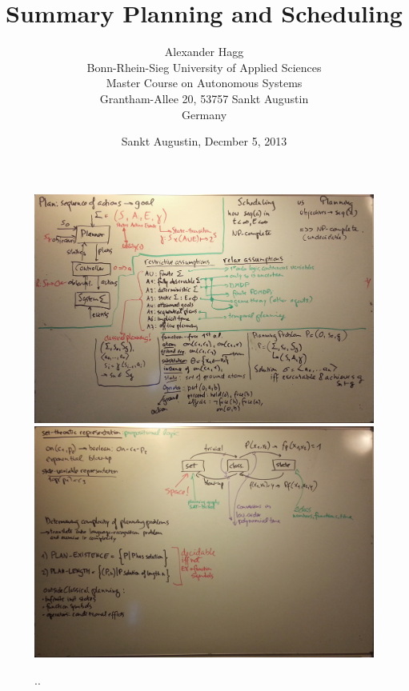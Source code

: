 \documentclass[a4paper,11pt,notitlepage]{article}
\title{\Huge\bf Summary Planning and Scheduling}
\author{\large Alexander Hagg\\
	Bonn-Rhein-Sieg University of Applied Sciences \\
	Master Course on Autonomous Systems \\
	Grantham-Allee 20, 53757 Sankt Augustin \\ Germany }
\date{Sankt Augustin, Decmber 5, 2013}
\begin{document}
\maketitle
\thispagestyle{empty}

\FloatBarrier
\newpage

\begin{figure}[ht!]
\centering
\includegraphics[width=180mm]{img/1.jpg}
\includegraphics[width=180mm]{img/2.jpg}
\caption{..}
\label{ideas}
\end{figure}
\end{document}
